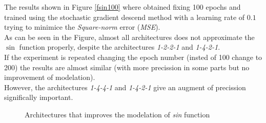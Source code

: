 \documentclass[a4paper, 11pt]{article}
\begin{document}
The results shown in Figure \ref{fsin100} where obtained fixing 100 epochs and trained using the stochastic gradient descend method with a learning rate of $0.1$ trying to minimice the \textit{Square-norm} error (\textit{MSE}).\\
As can be seen in the Figure, almost all architectures does not approximate the $\sin$ function properly, despite the architectures \textit{1-2-2-1} and \textit{1-4-2-1}.\\
If the experiment is repeated changing the epoch number (insted of 100 change to 200) the results are almost similar (with more precission in some parts but no improvement of modelation).\\
However, the architectures \textit{1-4-4-1} and \textit{1-4-2-1} give an augment of precission significally important.
\begin{figure}[h]
    \hspace{1em}
    \caption{Architectures that improves the modelation of \textit{sin} function}
    \label{fsin200}
\end{figure}
\end{document}
